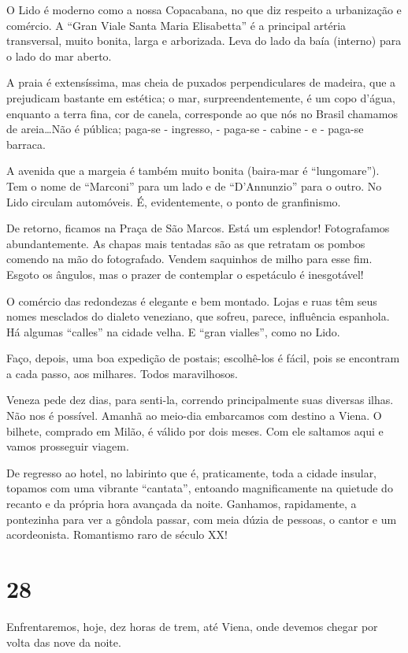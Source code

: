 O Lido é moderno como a nossa Copacabana, no que diz respeito a urbanização e comércio. A “Gran Viale Santa Maria Elisabetta” é a principal artéria transversal, muito bonita, larga e arborizada. Leva do lado da baía (interno) para o lado do mar aberto.

A praia é extensíssima, mas cheia de puxados perpendiculares de madeira, que a prejudicam bastante em estética; o mar, surpreendentemente, é um copo d’água, enquanto a terra fina, cor de canela, corresponde ao que nós no Brasil chamamos de areia\ldots Não é pública; paga-se - ingresso, - paga-se - cabine - e - paga-se barraca.

A avenida que a margeia é também muito bonita (baira-mar é “lungomare”). Tem o nome de “Marconi” para um lado e de “D’Annunzio” para o outro. No Lido circulam automóveis. É, evidentemente, o ponto de granfinismo.

De retorno, ficamos na Praça de São Marcos. Está um esplendor! Fotografamos abundantemente. As chapas mais tentadas são as que retratam os pombos comendo na mão do fotografado. Vendem saquinhos de milho para esse fim. Esgoto os ângulos, mas o prazer de contemplar o espetáculo é inesgotável!

O comércio das redondezas é elegante e bem montado. Lojas e ruas têm seus nomes mesclados do dialeto veneziano, que sofreu, parece, influência espanhola. Há algumas “calles” na cidade velha. E “gran vialles”, como no Lido.

Faço, depois, uma boa expedição de postais; escolhê-los é fácil, pois se encontram a cada passo, aos milhares. Todos maravilhosos.

Veneza pede dez dias, para senti-la, correndo principalmente suas diversas ilhas. Não nos é possível. Amanhã ao meio-dia embarcamos com destino a Viena. O bilhete, comprado em Milão, é válido por dois meses. Com ele saltamos aqui e vamos prosseguir viagem.

De regresso ao hotel, no labirinto que é, praticamente, toda a cidade insular, topamos com uma vibrante “cantata”, entoando magnificamente na quietude do recanto e da própria hora avançada da noite. Ganhamos, rapidamente, a pontezinha para ver a gôndola passar, com meia dúzia de pessoas, o cantor e um acordeonista. Romantismo raro de século XX!

\section*{28 \adfflatleafright {}}
Enfrentaremos, hoje, dez horas de trem, até Viena, onde devemos chegar por volta das nove da noite.

